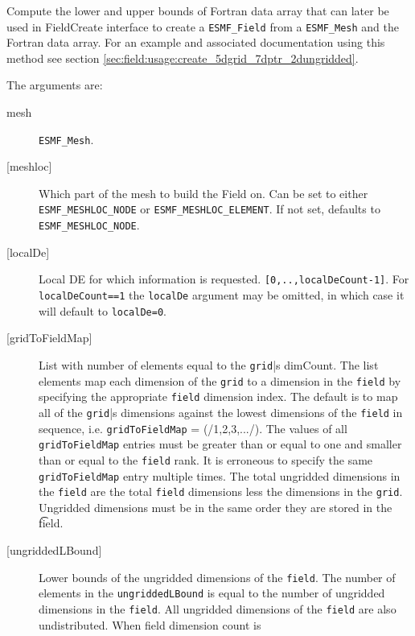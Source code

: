    Compute the lower and upper bounds of Fortran data array that can later
   be used in FieldCreate interface to create a {\tt ESMF\_Field} from a
   {\tt ESMF\_Mesh} and the Fortran data array. For an example and
   associated documentation using this method see section 
   \ref{sec:field:usage:create_5dgrid_7dptr_2dungridded}.
  
   The arguments are:
   \begin{description}
   \item [mesh]
         {\tt ESMF\_Mesh}.
   \item [{[meshloc]}]
         \begin{sloppypar}
         Which part of the mesh to build the Field on. Can be set to either
         {\tt ESMF\_MESHLOC\_NODE} or {\tt ESMF\_MESHLOC\_ELEMENT}. If not set,
         defaults to {\tt ESMF\_MESHLOC\_NODE}.
         \end{sloppypar}
   \item [{[localDe]}]
         Local DE for which information is requested. {\tt [0,..,localDeCount-1]}.
         For {\tt localDeCount==1} the {\tt localDe} argument may be omitted,
         in which case it will default to {\tt localDe=0}.
   \item [{[gridToFieldMap]}]
         List with number of elements equal to the
         {\tt grid}|s dimCount.  The list elements map each dimension
         of the {\tt grid} to a dimension in the {\tt field} by
         specifying the appropriate {\tt field} dimension index. The default is to
         map all of the {\tt grid}|s dimensions against the lowest dimensions of
         the {\tt field} in sequence, i.e. {\tt gridToFieldMap} = (/1,2,3,.../).
         The values of all {\tt gridToFieldMap} entries must be greater than or equal
         to one and smaller than or equal to the {\tt field} rank.
         It is erroneous to specify the same {\tt gridToFieldMap} entry
         multiple times. The total ungridded dimensions in the {\tt field}
         are the total {\tt field} dimensions less
         the dimensions in
         the {\tt grid}.  Ungridded dimensions must be in the same order they are
         stored in the {\t field}.  
   \item [{[ungriddedLBound]}]
         Lower bounds of the ungridded dimensions of the {\tt field}.
         The number of elements in the {\tt ungriddedLBound} is equal to the number of ungridded
         dimensions in the {\tt field}.  All ungridded dimensions of the
         {\tt field} are also undistributed. When field dimension count is

\end{description}
